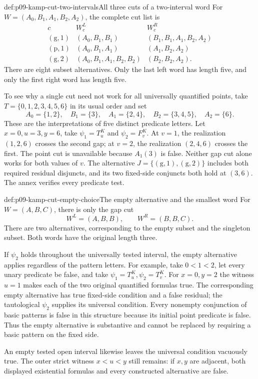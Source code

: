 \begin{hbexample}{def:p09-kamp-cut-two-intervals}{All three cuts of a two-interval word}
For \(W=(A_0,B_1,A_1,B_2,A_2)\), the complete cut list is
\[
\begin{array}{c|c|c}
 c&W_c^L&W_c^R\\ \hline
 (\mathrm g,1)&(A_0,B_1,B_1)&(B_1,B_1,A_1,B_2,A_2)\\
 (\mathrm p,1)&(A_0,B_1,A_1)&(A_1,B_2,A_2)\\
 (\mathrm g,2)&(A_0,B_1,A_1,B_2,B_2)&(B_2,B_2,A_2).
\end{array}
\]
There are eight subset alternatives. Only the last left word has
length five, and only the first right word has length five.

To see why a single cut need not work for all universally quantified
points, take \(T=\{0,1,2,3,4,5,6\}\) in its usual order and set
\[
 A_0=\{1,2\},\quad B_1=\{3\},\quad A_1=\{2,4\},\quad
 B_2=\{3,4,5\},\quad A_2=\{6\}.
\]
These are the interpretations of five distinct predicate letters.
Let \(x=0,u=3,y=6\), take \(\psi_1=T^K_u\) and
\(\psi_2=F^K_v\). At \(v=1\), the realization \((1,2,6)\)
crosses the second gap; at \(v=2\), the realization \((2,4,6)\)
crosses the first. The point cut is unavailable because \(A_1(3)\)
is false. Neither gap cut alone works for both values of \(v\).
The alternative \(J=\{(\mathrm g,1),(\mathrm g,2)\}\) includes
both required residual disjuncts, and its two fixed-side conjuncts
both hold at \((3,6)\). The annex verifies every predicate test.
\end{hbexample}

\begin{hbexample}{def:p09-kamp-cut-empty-choice}{The empty alternative and the smallest word}
For \(W=(A,B,C)\), there is only the gap cut
\[
                    W^L=(A,B,B),\qquad W^R=(B,B,C).
\]
There are two alternatives, corresponding to the empty subset and
the singleton subset. Both words have the original length three.

If \(\psi_2\) holds throughout the universally tested interval,
the empty alternative applies regardless of the pattern letters.
For example, take \(0<1<2\), let every unary predicate be false,
and take \(\psi_1=T^K_u,\psi_2=T^K_v\). For \(x=0,y=2\)
the witness \(u=1\) makes each of the two original quantified
formulas true. The corresponding empty alternative has true fixed-side
condition and a false residual; the tautological \(\psi_2\)
supplies its universal condition. Every nonempty conjunction of basic
patterns is false in this structure because its initial point predicate
is false. Thus the empty alternative is substantive and cannot be
replaced by requiring a basic pattern on the fixed side.

An empty tested open interval likewise leaves the universal condition
vacuously true. The outer strict witness \(x<u<y\) still remains:
if \(x,y\) are adjacent, both displayed existential formulas and
every constructed alternative are false.
\end{hbexample}

